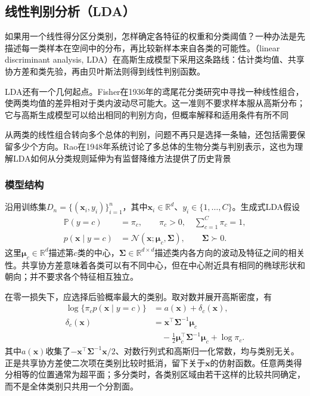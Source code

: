 \subsection{线性判别分析（LDA）}
\label{sec:classification-lda}

如果用一个线性得分区分类别，怎样确定各特征的权重和分类阈值？一种办法是先描述每一类样本在空间中的分布，再比较新样本来自各类的可能性。（linear discriminant analysis, LDA）在高斯生成模型下采用这条路线：估计类均值、共享协方差和类先验，再由贝叶斯法则得到线性判别函数。

LDA还有一个几何起点。Fisher在1936年的鸢尾花分类研究中寻找一种线性组合，使两类均值的差异相对于类内波动尽可能大。这一准则不要求样本服从高斯分布；它与高斯生成模型可以给出相同的判别方向，但概率解释和适用条件有所不同

从两类的线性组合转向多个总体的判别，问题不再只是选择一条轴，还包括需要保留多少个方向。Rao在1948年系统讨论了多总体的生物分类与判别表示，这也为理解LDA如何从分类规则延伸为有监督降维方法提供了历史背景

\subsubsection{模型结构}
\label{sec:classification-lda-model}

沿用训练集$D_n=\{(\bm{x}_i,y_i)\}_{i=1}^{n}$，其中$\bm{x}_i\in\mathbb{R}^{d}$、$y_i\in\{1,\ldots,C\}$。生成式LDA假设
\begin{equation}
  \label{eq:classification-lda-distribution}
  \begin{aligned}
    \mathbb{P}(y=c)&=\pi_c,\qquad \pi_c>0,\quad
      \sum_{c=1}^{C}\pi_c=1,\\
    p(\bm{x}\mid y=c)&=\mathcal{N}(\bm{x};\bm{\mu}_c,\bm{\Sigma}),
      \qquad \bm{\Sigma}\succ0 .
  \end{aligned}
\end{equation}
这里$\bm{\mu}_c\in\mathbb{R}^{d}$描述第$c$类的中心，$\bm{\Sigma}\in\mathbb{R}^{d\times d}$描述类内各方向的波动及特征之间的相关性。共享协方差意味着各类可以有不同中心，但在中心附近具有相同的椭球形状和朝向；并不要求各个特征相互独立。

在零一损失下，应选择后验概率最大的类别。取对数并展开高斯密度，有
\begin{equation}
  \label{eq:classification-lda-score}
  \begin{aligned}
    \log\{\pi_c p(\bm{x}\mid y=c)\}
      &=a(\bm{x})+\delta_c(\bm{x}),\\
    \delta_c(\bm{x})
      &=\bm{x}^{\top}\bm{\Sigma}^{-1}\bm{\mu}_c\\
      &\quad-\frac12\bm{\mu}_c^{\top}\bm{\Sigma}^{-1}\bm{\mu}_c
        +\log\pi_c .
  \end{aligned}
\end{equation}
其中$a(\bm{x})$收集了$-\bm{x}^{\top}\bm{\Sigma}^{-1}\bm{x}/2$、对数行列式和高斯归一化常数，均与类别无关。正是共享协方差使二次项在类别比较时抵消，留下关于$\bm{x}$的仿射函数。任意两类得分相等的位置通常为超平面；多分类时，各类别区域由若干这样的比较共同确定，而不是全体类别只共用一个分割面。

